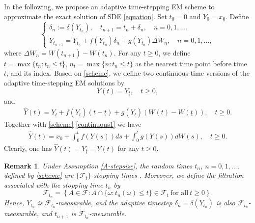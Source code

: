 \documentclass[preprint,12pt,compress]{elsarticle}
\newtheorem{remark}[theorem]{Remark}
\begin{document}
In the following, we propose an adaptive time-stepping EM scheme to approximate the exact solution of SDE \eqref{equation}. Set $t_0 = 0$ and $Y_0 = x_0$. Define
\begin{equation}  \label{scheme}
	\left\{  
	\begin{array}{l}
	    \delta _n := \delta (Y_{t_n}), \quad t_{n+1} = t_n + \delta _n , \quad n = 0,1,...,\\
		{Y_{{t_{n + 1}}}} =  {{Y_{{t_n}}} + f({Y_{{t_n}}}){\delta _n} + g({Y_{{t_n}}})\Delta {W_n}}, \quad n = 0,1,...,
	\end{array}
	\right.
\end{equation}
where $\Delta {W_n} = W({t_{n + 1}}) - W({t_n})$. For any $t \ge 0$, we define $ \underline{t}= \max \{ {t_n}:{t_n} \le t\} $, ${n_t} = \max \{ n:{t_n} \le t\} $ as the nearest time point
before time $t$, and its index. Based on \eqref{scheme}, we define two continuous-time versions of the adaptive time-stepping EM solutions by
\begin{equation} \label{continuous}
	Y(t) = Y_{\underline{t}}, \quad   t \ge 0,
\end{equation}
and
\begin{equation}   \label{continuous1}
\begin{split}
	\hat{Y}(t) = {Y_{\underline{t}}} + f({Y_{\underline{t}}})(t - \underline{t}) + g({Y_{\underline{t}}})(W(t) - W(\underline{t})) ,  \quad   t \ge 0.
\end{split}
\end{equation}
Together with \eqref{scheme}-\eqref{continuous1} we have
\begin{equation}  \label{continuous2}
\begin{split}
	\hat{Y}(t) = {x_0} + \int_0^t {f( Y(s))ds}  + \int_0^t {g(Y(s))dW(s)},  \quad   t \ge 0.
\end{split}
\end{equation}
Clearly, one has $\hat Y(\underline{t}) = Y_{\underline{t}} = {Y}(t)$ for any $t \ge 0$. 

\begin{remark}  \label{remark-filtration}
Under Assumption \ref{A-stepsize}, the random times $t_n$, $n = 0,1,...,$ defined by \eqref{scheme} are $\{\mathcal{F}_t\}$-stopping times \cite[Remark 3]{wen2026strong}.
Moreover, we define the filtration associated with the stopping time $t_n$ by
\begin{equation*} 
	\mathcal{F}_{t_n} 
	= \left\{ A \in \mathcal{F} : A \cap \{\omega : t_n(\omega) \le t\} \in \mathcal{F}_t \ \text{for all} \ t \ge 0 \right\}.
\end{equation*}
Hence, $Y_{t_n}$ is $\mathcal{F}_{t_n}$-measurable, and the adaptive timestep $\delta_n=\delta(Y_{t_n})$ is also $\mathcal{F}_{t_n}$-measurable, and $t_{n+1}$ is $\mathcal{F}_{t_{n}}$-measurable.
\end{remark}
\end{document}
